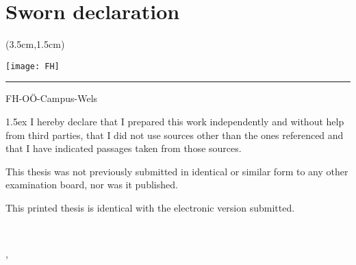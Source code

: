 
	{
	\renewcommand*\chapterheadstartvskip{\vspace*{7\topskip}}
	\chapter{Sworn declaration}
	}

	\begin{textblock*}{15cm}(3.5cm,1.5cm)
		\begin{flushright}
			\texttt{[image: FH]}
		\end{flushright}
		\rule{15cm}{0.1mm}
		\vspace{-2.2cm}
		\begin{flushright}
		    FH-OÖ-Campus-Wels
		\end{flushright}
	\end{textblock*}

	\vfill
	\begin{minipage}[t]{0.33\textwidth}
	\end{minipage}
	\hfill
	\begin{minipage}[t]{0.66\textwidth}
		{\parskip 1.5ex		%
			I hereby declare that I prepared this work independently and without help from third parties, that I did not use sources other than the ones referenced and that I have indicated passages taken from those sources.

            This thesis was not previously submitted in identical or similar form to any other examination board, nor was it published.

            This printed thesis is identical with the electronic version submitted.
		}
		\vspace{25mm}

		\begin{minipage}[t]{7.5cm}
			\centering \dotfill \\
		\end{minipage}
		\vskip 6pt
		\printauthor
		\vskip 6pt
		\printlocation, {\printsubmonth\ \printsubyear}
	\end{minipage}
	\vfill